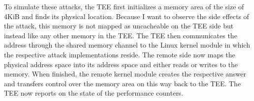 To simulate these attacks, the TEE first initializes a memory area of the size
of 4KiB and finds its physical location. Because I want to observe the side
effects of the attack, this memory is not mapped as uncacheable on the TEE side
but instead like any other memory in the TEE. The TEE then communicates the
address through the shared memory channel to the Linux kernel module in which
the respective attack implementations reside. The remote side now maps the
physical address space into its address space and either reads or writes to the
memory. When finished, the remote kernel module creates the respective answer
and transfers control over the memory area on this way back to the TEE. The TEE
now reports on the state of the performance counters.\\




